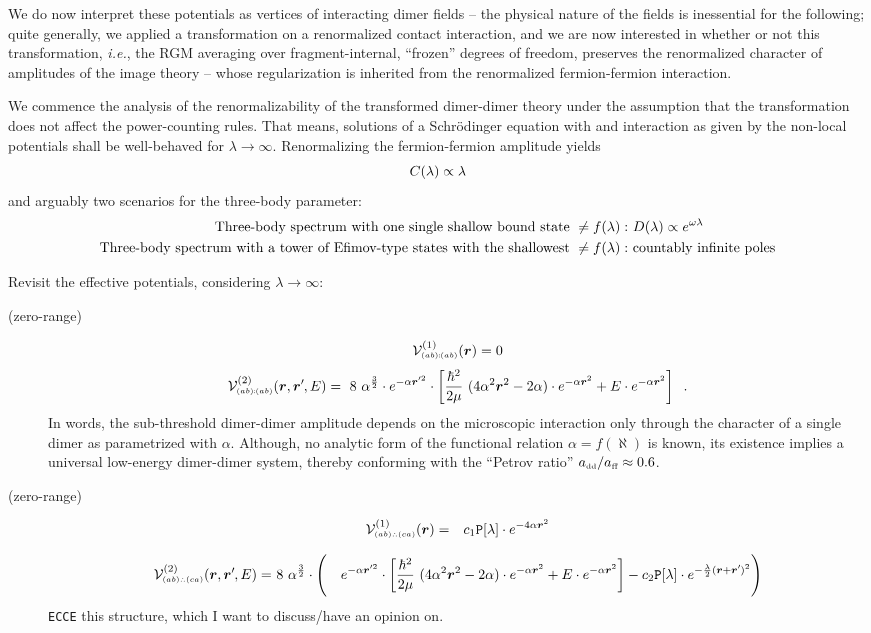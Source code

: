 \documentclass[onecolumn,preprint,superscriptaddress,nofootinbib,notitlepage,10pt,linenumbers]{revtex4-1}
\newcommand*{\mprime}{^{\prime}\mkern-1.2mu}
\newcommand{\la}{\label}
\newcommand{\be}{\begin{equation}}
\newcommand{\ee}{\end{equation}}
\newcommand{\ie}{\textit{i.e.}\;}
\newcommand{\ve}[1]{\ensuremath{\boldsymbol{#1}}}
\newcommand{\cc}{\ensuremath C(\lambda)}
\newcommand{\dd}{\ensuremath D(\lambda)}
\newcommand{\abab}{\ensuremath $(ab)\!\!:\!\!(ab)$}
\newcommand{\abca}{\ensuremath $(ab)\wasytherefore(ca)$}
\newcommand{\aff}{\ensuremath a_{\text{\tiny ff}}}
\newcommand{\add}{\ensuremath a_{\text{\tiny dd}}}
\begin{document}
We do now interpret these potentials as vertices of interacting dimer fields -- the physical nature of the fields is
inessential for the following; quite generally, we applied a transformation on a renormalized contact interaction, and
we are now interested in whether or not this transformation, \ie, the RGM averaging over fragment-internal, ``frozen''
degrees of freedom, preserves the renormalized character of amplitudes of the image theory -- whose regularization is
inherited from the renormalized fermion-fermion interaction.

We commence the analysis of the renormalizability of the transformed dimer-dimer theory under the assumption that
the transformation does not affect the power-counting rules. That means, solutions of a Schr\"odinger equation
with and interaction as given by the non-local potentials shall be well-behaved for $\lambda\to\infty$.
Renormalizing the fermion-fermion amplitude yields
\be\la{eq.c0running}
\cc\propto\lambda
\ee
and arguably two scenarios for the three-body parameter:
\begin{align}
\text{Three-body spectrum with one single shallow bound state}~\neq f(\lambda):~&\dd\propto e^{\omega\lambda}\\
\text{Three-body spectrum with a tower of Efimov-type states with the shallowest}~\neq f(\lambda):~&\text{countably infinite poles}
\end{align}

Revisit the effective potentials, considering $\lambda\to\infty$:
\begin{description}
	\item[(zero-range)~\abab]
\be
\mathcal{V}^{(1)}_{\text{\tiny\abab}}(\ve{r})=0
\ee
\be
\mathcal{V}^{(2)}_{\text{\tiny\abab}}(\ve{r},\ve{r}\mprime,E)=
~8~\alpha^{\frac{3}{2}}\cdot e^{-\alpha\ve{r}\mprime^2}\cdot
\left[\frac{\hbar^2}{2\mu}~(4\alpha^2\ve{r}^2-2\alpha)
\cdot e^{-\alpha\ve{r}^2}+
E\cdot e^{-\alpha\ve{r}^2}\right]\;\;.
\ee
In words, the sub-threshold dimer-dimer amplitude depends on the microscopic interaction only through the
character of a single dimer as parametrized with $\alpha$. Although, no analytic form of the functional relation
$\alpha=f(\aleph)$ is known, its existence implies a universal low-energy dimer-dimer system, thereby conforming with
the ``Petrov ratio'' $\add/\aff\approx0.6$. 
\item[(zero-range)~\abca]
\begin{eqnarray}
\mathcal{V}^{(1)}_{\text{\tiny\abca}}(\ve{r})&=&
c_1\texttt{P}[\lambda]\cdot
 e^{-4\alpha\ve{r}^2}
\end{eqnarray}


\begin{eqnarray}
\mathcal{V}^{(2)}_{\text{\tiny\abca}}(\ve{r},\ve{r}\mprime,E)=&~8~\alpha^{\frac{3}{2}}\cdot\Bigg(&e^{-\alpha\ve{r}\mprime^2}\cdot
\left[\frac{\hbar^2}{2\mu}~(4\alpha^2\ve{r}^2-2\alpha)
\cdot e^{-\alpha\ve{r}^2}+
E\cdot e^{-\alpha\ve{r}^2}\right]-c_2\texttt{P}[\lambda]\cdot
 e^{-\frac{\lambda}{2}(\ve{r}+\ve{r}\mprime)^2}\Bigg)
\end{eqnarray}
\texttt{ECCE} this structure, which I want to discuss/have an opinion on.
\end{description}
\end{document}
